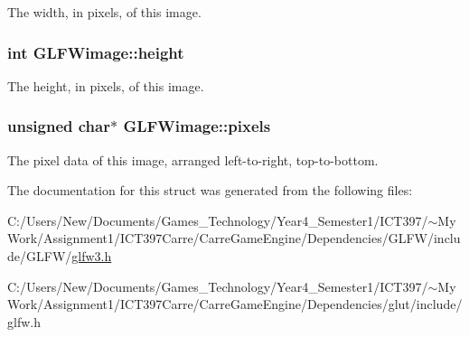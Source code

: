 The width, in pixels, of this image. \hypertarget{struct_g_l_f_wimage_0b7d95368f0c80d5e5c9875057c7dbec}{
\subsubsection[height]{\setlength{\rightskip}{0pt plus 5cm}int {\bf GLFWimage::height}}}
\label{struct_g_l_f_wimage_0b7d95368f0c80d5e5c9875057c7dbec}


The height, in pixels, of this image. \hypertarget{struct_g_l_f_wimage_0c532a5c2bb715555279b7817daba0fb}{
\subsubsection[pixels]{\setlength{\rightskip}{0pt plus 5cm}unsigned char$\ast$ {\bf GLFWimage::pixels}}}
\label{struct_g_l_f_wimage_0c532a5c2bb715555279b7817daba0fb}


The pixel data of this image, arranged left-to-right, top-to-bottom. 

The documentation for this struct was generated from the following files:\begin{CompactItemize}
\item 
C:/Users/New/Documents/Games\_\-Technology/Year4\_\-Semester1/ICT397/$\sim$My Work/Assignment1/ICT397Carre/CarreGameEngine/Dependencies/GLFW/include/GLFW/\hyperlink{glfw3_8h}{glfw3.h}\item 
C:/Users/New/Documents/Games\_\-Technology/Year4\_\-Semester1/ICT397/$\sim$My Work/Assignment1/ICT397Carre/CarreGameEngine/Dependencies/glut/include/glfw.h\end{CompactItemize}
